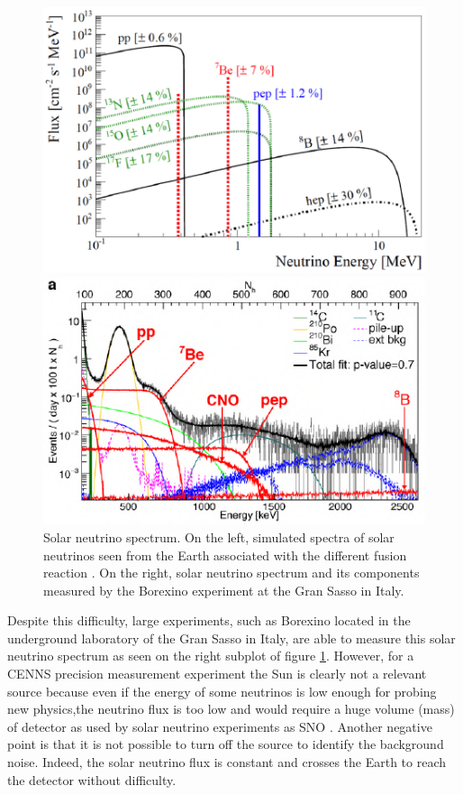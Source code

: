 \begin{figure}
\begin{minipage}{0.48\textwidth}
\includegraphics [scale=1]{Figures/Introduction/solar_neutrino_spectrum_simu.pdf}
\end{minipage}
\hfill
\begin{minipage}{0.48\textwidth}
\includegraphics [scale=1]{Figures/Introduction/solar_neutrino_spectrum_exp.pdf}
\end{minipage}
\caption{Solar neutrino spectrum. On the left, simulated spectra of solar neutrinos seen from the Earth associated with the different fusion reaction \cite{DAngelo:2014lmb}.
On the right, solar neutrino spectrum and its components measured by the Borexino experiment at the Gran Sasso in Italy.}
\label{fig:solar-neutrino-spectrum}
\end{figure}

Despite this difficulty, large experiments, such as Borexino located in the underground laboratory of the Gran Sasso in Italy, are able to measure this solar neutrino spectrum as seen on the right subplot of figure \ref{fig:solar-neutrino-spectrum}. However, for a CENNS precision measurement experiment the Sun is clearly not a relevant source because even if the energy of some neutrinos is low enough for probing new physics,the neutrino flux is too low and would require a huge volume (mass) of detector as used by solar neutrino experiments as SNO \cite{Bellerive:2016}. Another negative point is that it is not possible to turn off the source to identify the background noise. Indeed, the solar neutrino flux is constant and crosses the Earth to reach the detector without difficulty.

